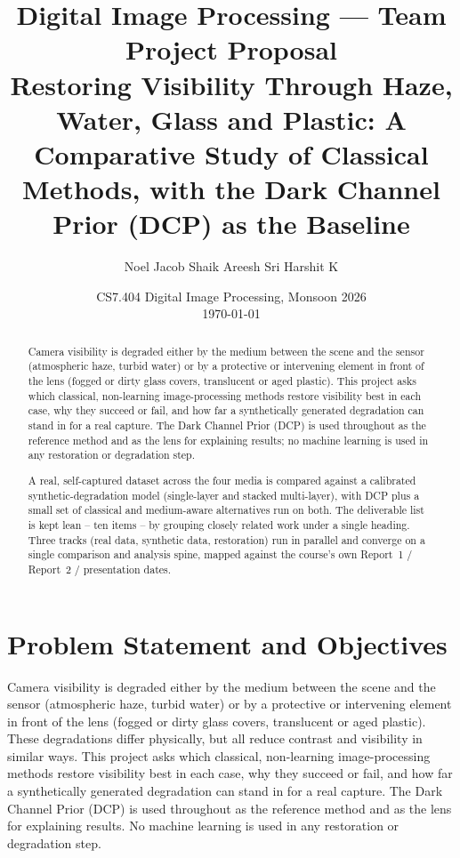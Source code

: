 \documentclass[12pt,a4paper]{article}
\title{\textbf{Digital Image Processing --- Team Project Proposal}\\[2pt]
\large Restoring Visibility Through Haze, Water, Glass and Plastic:
A Comparative Study of Classical Methods, with the Dark Channel Prior
(DCP) as the Baseline}
\author{Noel Jacob \quad Shaik Areesh \quad Sri Harshit K}
\date{CS7.404 Digital Image Processing, Monsoon 2026 \\ \today}
\begin{document}
\maketitle

\begin{abstract}
\noindent
Camera visibility is degraded either by the medium between the scene and
the sensor (atmospheric haze, turbid water) or by a protective or
intervening element in front of the lens (fogged or dirty glass covers,
translucent or aged plastic). This project asks which classical,
non-learning image-processing methods restore visibility best in each
case, why they succeed or fail, and how far a synthetically generated
degradation can stand in for a real capture. The Dark Channel Prior
(DCP) is used throughout as the reference method and as the lens for
explaining results; no machine learning is used in any restoration or
degradation step.

A real, self-captured dataset across the four media is compared against
a calibrated synthetic-degradation model (single-layer and stacked
multi-layer), with DCP plus a small set of classical and medium-aware
alternatives run on both. The deliverable list is kept lean -- ten
items -- by grouping closely related work under a single heading. Three
tracks (real data, synthetic data, restoration) run in parallel and
converge on a single comparison and analysis spine, mapped against the
course's own Report~1 / Report~2 / presentation dates.
\end{abstract}

\tableofcontents
\bigskip

\section{Problem Statement and Objectives}

Camera visibility is degraded either by the medium between the scene and
the sensor (atmospheric haze, turbid water) or by a protective or
intervening element in front of the lens (fogged or dirty glass covers,
translucent or aged plastic). These degradations differ physically, but
all reduce contrast and visibility in similar ways. This project asks
which classical, non-learning image-processing methods restore
visibility best in each case, why they succeed or fail, and how far a
synthetically generated degradation can stand in for a real capture. The
Dark Channel Prior (DCP) is used throughout as the reference method and
as the lens for explaining results. No machine learning is used in any
restoration or degradation step.
\end{document}
